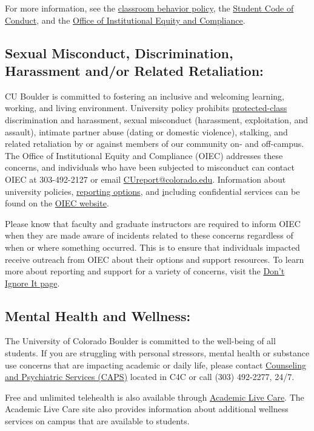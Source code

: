 For more information, see the \href{https://www.colorado.edu/compliance/policies/student-classroom-course-related-behavior}{classroom behavior policy}, the \href{https://www.colorado.edu/sccr/media/230}{Student Code of Conduct}, and the \href{https://www.colorado.edu/oiec/}{Office of Institutional Equity and Compliance}. 

\subsection*{Sexual Misconduct, Discrimination, Harassment and/or Related Retaliation:}
CU Boulder is committed to fostering an inclusive and welcoming learning, working, and living environment. University policy prohibits \href{https://www.colorado.edu/oiec/policies/discrimination-harassment-policy/protected-class-definitions}{protected-class} discrimination and harassment, sexual misconduct (harassment, exploitation, and assault), intimate partner abuse (dating or domestic violence), stalking, and related retaliation by or against members of our community on- and off-campus. The Office of Institutional Equity and Compliance (OIEC) addresses these concerns, and individuals who have been subjected to misconduct can contact OIEC at 303-492-2127 or email \href{mailto:CUreport@colorado.edu}{CUreport@colorado.edu}. Information about university policies, \href{https://www.colorado.edu/oiec/reporting-resolutions/making-report}{reporting options}, and \href{OIEC support resources} including confidential services can be found on the \href{http://www.colorado.edu/institutionalequity/}{OIEC website}.

Please know that faculty and graduate instructors are required to inform OIEC when they are made aware of incidents related to these concerns regardless of when or where something occurred. This is to ensure that individuals impacted receive outreach from OIEC about their options and support resources. To learn more about reporting and support for a variety of concerns, visit the \href{https://www.colorado.edu/dontignoreit/}{Don't Ignore It page}.


\subsection*{Mental Health and Wellness:}
The University of Colorado Boulder is committed to the well-being of all students. If you are struggling with personal stressors, mental health or substance use concerns that are impacting academic or daily life, please contact \href{https://www.colorado.edu/counseling/}{Counseling and Psychiatric Services (CAPS)} located in C4C or call (303) 492-2277, 24/7.

Free and unlimited telehealth is also available through \href{https://www.colorado.edu/health/academiclivecare}{Academic Live Care}. The Academic Live Care site also provides information about additional wellness services on campus that are available to students.
